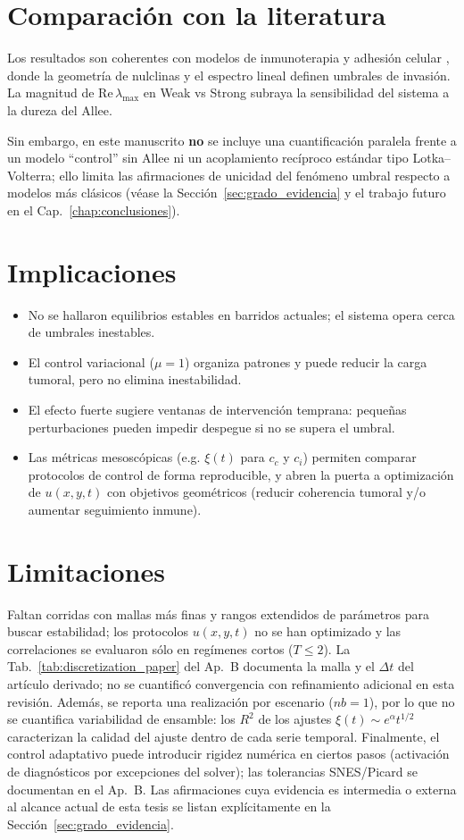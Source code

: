 \section{Comparación con la literatura}
Los resultados son coherentes con modelos de inmunoterapia \cite{delitala_mathematical_2007} y adhesión celular \cite{gatenby_role_2004}, donde la geometría de nulclinas y el espectro lineal definen umbrales de invasión. La magnitud de Re\,$\lambda_{\max}$ en Weak vs Strong subraya la sensibilidad del sistema a la dureza del Allee.

Sin embargo, en este manuscrito \textbf{no} se incluye una cuantificación paralela frente a un modelo ``control'' sin Allee ni un acoplamiento recíproco estándar tipo Lotka--Volterra; ello limita las afirmaciones de unicidad del fenómeno umbral respecto a modelos más clásicos (véase la Sección~\ref{sec:grado_evidencia} y el trabajo futuro en el Cap.~\ref{chap:conclusiones}).

\section{Implicaciones}
\begin{itemize}
  \item No se hallaron equilibrios estables en barridos actuales; el sistema opera cerca de umbrales inestables.
  \item El control variacional ($\mu=1$) organiza patrones y puede reducir la carga tumoral, pero no elimina inestabilidad.
  \item El efecto fuerte sugiere ventanas de intervención temprana: pequeñas perturbaciones pueden impedir despegue si no se supera el umbral.
  \item Las métricas mesoscópicas (e.g. $\xi(t)$ para $c_c$ y $c_i$) permiten comparar protocolos de control de forma reproducible, y abren la puerta a optimización de $u(x,y,t)$ con objetivos geométricos (reducir coherencia tumoral y/o aumentar seguimiento inmune).
\end{itemize}

\section{Limitaciones}
Faltan corridas con mallas más finas y rangos extendidos de parámetros para buscar estabilidad; los protocolos $u(x,y,t)$ no se han optimizado y las correlaciones se evaluaron sólo en regímenes cortos ($T\le 2$). La Tab.~\ref{tab:discretization_paper} del Ap.~B documenta la malla y el $\Delta t$ del artículo derivado; no se cuantificó convergencia con refinamiento adicional en esta revisión. Además, se reporta una realización por escenario ($nb=1$), por lo que no se cuantifica variabilidad de ensamble: los $R^2$ de los ajustes $\xi(t)\sim e^{\alpha}t^{1/2}$ caracterizan la calidad del ajuste dentro de cada serie temporal. Finalmente, el control adaptativo puede introducir rigidez numérica en ciertos pasos (activación de diagnósticos por excepciones del solver); las tolerancias SNES/Picard se documentan en el Ap.~B. Las afirmaciones cuya evidencia es intermedia o externa al alcance actual de esta tesis se listan explícitamente en la Sección~\ref{sec:grado_evidencia}.

